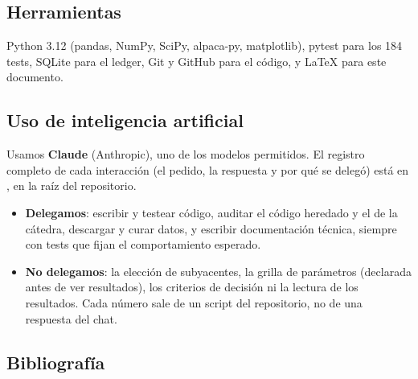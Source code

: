 \documentclass[11pt,a4paper]{article}
\newcommand{\code}[1]{\texttt{\detokenize{#1}}}
\begin{document}
\subsection{Herramientas}

Python 3.12 (pandas, NumPy, SciPy, alpaca-py, matplotlib), pytest para los 184 tests, SQLite para el ledger, Git y
GitHub para el código, y \LaTeX{} para este documento.

\subsection{Uso de inteligencia artificial}

Usamos \textbf{Claude} (Anthropic), uno de los modelos permitidos. El registro completo de cada interacción (el
pedido, la respuesta y por qué se delegó) está en \code{AI_LOG.md}, en la raíz del repositorio.

\begin{itemize}
\item \textbf{Delegamos}: escribir y testear código, auditar el código heredado y el de la cátedra, descargar y curar
  datos, y escribir documentación técnica, siempre con tests que fijan el comportamiento esperado.
\item \textbf{No delegamos}: la elección de subyacentes, la grilla de parámetros (declarada antes de ver resultados),
  los criterios de decisión ni la lectura de los resultados. Cada número sale de un script del repositorio, no de una
  respuesta del chat.
\end{itemize}

\subsection{Bibliografía}
\end{document}
